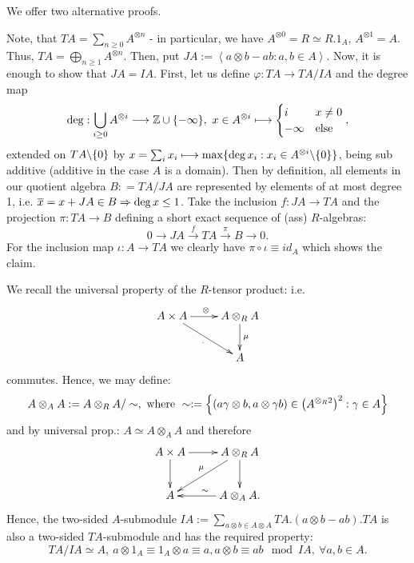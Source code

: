 \bws We offer two alternative proofs.
\bn
\item Note, that $T A = \sum_{n \geq 0} A^{\otimes n}$ - in particular, we have $A^{\otimes 0} = R \simeq R.1_A$, $A^{\otimes 1} = A$. Thus, $T A = \bigoplus_{n \geq 1} A^{\otimes n}$. Then, put $J A := \left<a \otimes b - a b : a, b \in A\right>$. Now, it is enough to show that $J A = I A$. First, let us define $\varphi : T A \longrightarrow T A/I A$ and the degree map
$$\deg : \bigcup_{i \geq 0} A^{\otimes i} \longrightarrow \mathbb{Z} \cup \{-\infty\},\ x \in A^{\otimes i} \longmapsto \begin{cases}
i & x \neq 0\\
-\infty & \mathrm{else}\\
\end{cases},$$ extended on $T A\backslash\{0\}$ by $x = \sum_i x_i \longmapsto \max\{\deg x_i : x_i \in A^{\otimes i}\backslash\{0\}\}$,
 being sub additive (additive in the case $A$ is a domain). Then by definition, all elements in our quotient algebra $B: = T A/J A$ are represented by elements of at most degree 1, i.e. $\overline{x} = x + J A \in B \Rightarrow \deg x \leq 1$. Take the inclusion $f : J A \longrightarrow T A$ and the projection $\pi : T A \longrightarrow B$ defining a short exact sequence of (ass) $R$-algebras:
$$0 \longrightarrow J A \stackrel{f}{\longrightarrow} T A \stackrel{\pi}{\longrightarrow} B \longrightarrow 0.$$
For the inclusion map $\iota : A \longrightarrow T A$ we clearly have $\pi \circ \iota \equiv id_A$ which shows the claim.\\
\item We recall the universal property of the $R$-tensor product: i.e.
$$\xymatrix{
A \times A \ar[rd]_{\cdot}\ar[r]^{\otimes} & A \otimes_R A\ar[d]^{\mu}\\
& A\\
}$$
commutes. Hence, we may define:
$$A \otimes_A A := A \otimes_R A/\sim,\ \trm{where}\ \sim := \left\{(a \gamma \otimes b, a \otimes \gamma b) \in \left(A^{\otimes_R 2}\right)^2 : \gamma \in A\right\}$$
and by universal prop.: $A \simeq A\otimes_A A$ and therefore
$$\xymatrix{
A \times A \ar[r]\ar[d] & A \otimes_R A \ar[d]\ar[ld]_{\mu}\\
A & A \otimes_A A.\ar[l]_{\sim}\\
}$$
Hence, the two-sided $A$-submodule $I A := \sum_{a \otimes b \in A \otimes A}T A.(a \otimes b - a b). T A$ is also a two-sided $T A$-submodule and has the required property:
$$T A/I A \simeq A,\ a \otimes 1_A \equiv 1_A \otimes a \equiv a, a \otimes b \equiv ab \mod I A,\ \forall a, b \in A.$$
